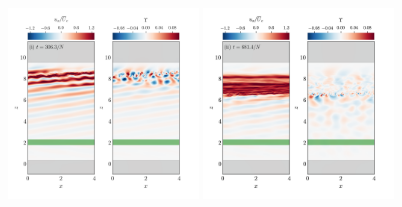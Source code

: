 \documentclass[
        fleqn,
        usenatbib,
    ]{mnras}
\begin{document}
\begin{figure}
    \includegraphics[width=0.45\textwidth]{plots/yubo_000040_labeled.png}\hfil
    \includegraphics[width=0.45\textwidth]{plots/yubo_000089_labeled.png}


\end{figure}
\end{document}

